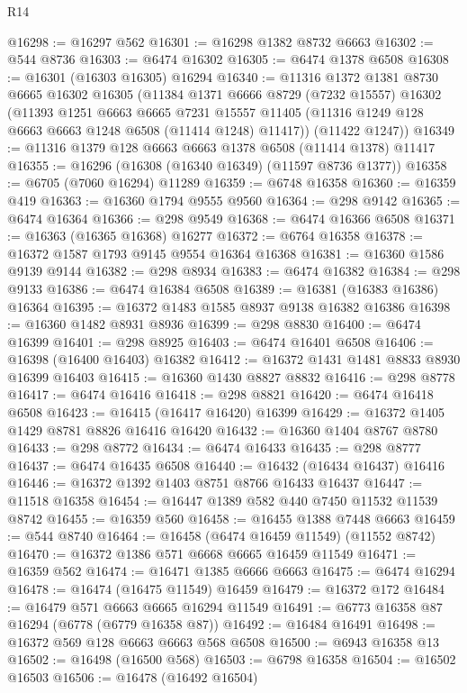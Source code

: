 \begin{lexlean}{R14}
\begin{coremodule}
@16298 := @16297 @562
@16301 := @16298 @1382 @8732 @6663
@16302 := @544 @8736
@16303 := @6474 @16302
@16305 := @6474 @1378 @6508
@16308 := @16301 (@16303 @16305) @16294
@16340 := @11316
    @1372
    @1381
    @8730
    @6665
    @16302
    @16305
    (@11384
      @1371
      @6666
      @8729
      (@7232 @15557)
      @16302
      (@11393
        @1251
        @6663
        @6665
        @7231
        @15557
        @11405
        (@11316 @1249 @128 @6663 @6663 @1248 @6508 (@11414 @1248) @11417))
      (@11422 @1247))
@16349 := @11316 @1379 @128 @6663 @6663 @1378 @6508 (@11414 @1378) @11417
@16355 := @16296 (@16308 (@16340 @16349) (@11597 @8736 @1377))
@16358 := @6705 (@7060 @16294) @11289
@16359 := @6748 @16358
@16360 := @16359 @419
@16363 := @16360 @1794 @9555 @9560
@16364 := @298 @9142
@16365 := @6474 @16364
@16366 := @298 @9549
@16368 := @6474 @16366 @6508
@16371 := @16363 (@16365 @16368) @16277
@16372 := @6764 @16358
@16378 := @16372 @1587 @1793 @9145 @9554 @16364 @16368
@16381 := @16360 @1586 @9139 @9144
@16382 := @298 @8934
@16383 := @6474 @16382
@16384 := @298 @9133
@16386 := @6474 @16384 @6508
@16389 := @16381 (@16383 @16386) @16364
@16395 := @16372 @1483 @1585 @8937 @9138 @16382 @16386
@16398 := @16360 @1482 @8931 @8936
@16399 := @298 @8830
@16400 := @6474 @16399
@16401 := @298 @8925
@16403 := @6474 @16401 @6508
@16406 := @16398 (@16400 @16403) @16382
@16412 := @16372 @1431 @1481 @8833 @8930 @16399 @16403
@16415 := @16360 @1430 @8827 @8832
@16416 := @298 @8778
@16417 := @6474 @16416
@16418 := @298 @8821
@16420 := @6474 @16418 @6508
@16423 := @16415 (@16417 @16420) @16399
@16429 := @16372 @1405 @1429 @8781 @8826 @16416 @16420
@16432 := @16360 @1404 @8767 @8780
@16433 := @298 @8772
@16434 := @6474 @16433
@16435 := @298 @8777
@16437 := @6474 @16435 @6508
@16440 := @16432 (@16434 @16437) @16416
@16446 := @16372 @1392 @1403 @8751 @8766 @16433 @16437
@16447 := @11518 @16358
@16454 := @16447 @1389 @582 @440 @7450 @11532 @11539 @8742
@16455 := @16359 @560
@16458 := @16455 @1388 @7448 @6663
@16459 := @544 @8740
@16464 := @16458 (@6474 @16459 @11549) (@11552 @8742)
@16470 := @16372 @1386 @571 @6668 @6665 @16459 @11549
@16471 := @16359 @562
@16474 := @16471 @1385 @6666 @6663
@16475 := @6474 @16294
@16478 := @16474 (@16475 @11549) @16459
@16479 := @16372 @172
@16484 := @16479 @571 @6663 @6665 @16294 @11549
@16491 := @6773 @16358 @87 @16294 (@6778 (@6779 @16358 @87))
@16492 := @16484 @16491
@16498 := @16372 @569 @128 @6663 @6663 @568 @6508
@16500 := @6943 @16358 @13
@16502 := @16498 (@16500 @568)
@16503 := @6798 @16358
@16504 := @16502 @16503
@16506 := @16478 (@16492 @16504)

\end{coremodule}
\end{lexlean}
